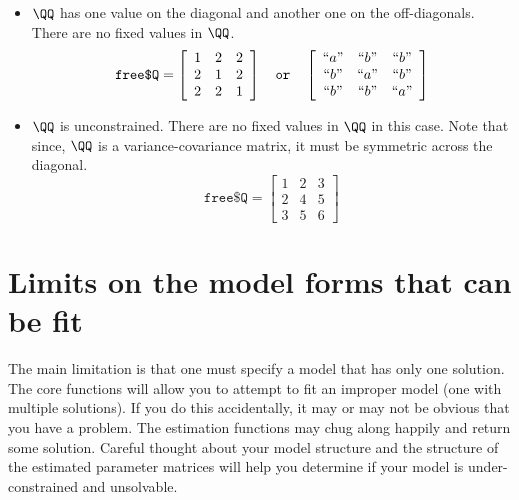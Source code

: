 \begin{itemize}
\item[] $\QQ$ has one value on the diagonal and another one on the off-diagonals. There are no fixed values in $\QQ$.
\begin{equation*}
 \texttt{free\$Q} =
 \left[ \begin{array}{ccc}
    1 & 2 & 2 \\
    2 & 1 & 2 \\
    2 & 2 & 1 \end{array} \right] \quad \texttt{or} \quad
 \left[ \begin{array}{ccc}
    ``a" & ``b" & ``b" \\
    ``b" & ``a" & ``b" \\
    ``b" & ``b" & ``a" \end{array} \right]
\end{equation*}

\item[] $\QQ$ is unconstrained.  There are no fixed values in $\QQ$ in this case.  Note that since, $\QQ$ is a variance-covariance matrix, it must be symmetric across the diagonal.  
\begin{equation*}
 \texttt{free\$Q} =
 \left[ \begin{array}{ccc}
    1 & 2 & 3 \\
    2 & 4 & 5 \\
    3 & 5 & 6 \end{array} \right] 
\end{equation*}
\end{itemize}

\section{Limits on the model forms that can be fit}

The main limitation is that one must specify a model that has only one solution.  The core functions will allow you to attempt to fit an improper model (one with multiple solutions).  If you do this accidentally, it may or may not be obvious that you have a problem.  The estimation functions may chug along happily and return some solution.  Careful thought about your model structure and the structure of the estimated parameter matrices will help you determine if your model is under-constrained and unsolvable.  